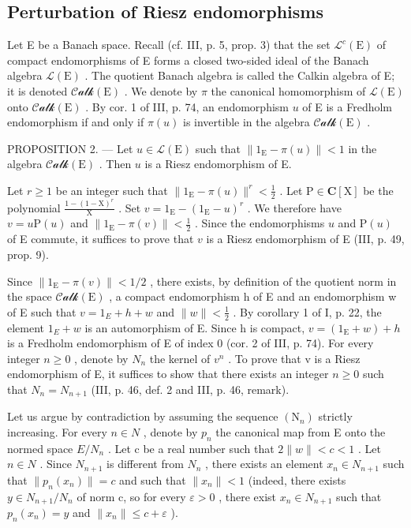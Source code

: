 \subsection{Perturbation of Riesz endomorphisms}

Let E be a Banach space. Recall (cf. III, p. 5, prop. 3) that the set \(\mathcal{L}^c (\mathrm{E})\) of compact endomorphisms of E forms a closed two-sided ideal of the Banach algebra \(\mathcal{L}(\mathrm{E})\) . The quotient Banach algebra is called the Calkin algebra of E; it is denoted \(\mathcal{Calk}(\mathrm{E})\) . We denote by \(\pi\) the canonical homomorphism of \(\mathcal{L}(\mathrm{E})\) onto \(\mathcal{Calk}(\mathrm{E})\) . By cor. 1 of III, p. 74, an endomorphism \(u\) of E is a Fredholm endomorphism if and only if \(\pi (u)\) is invertible in the algebra \(\mathcal{Calk}(\mathrm{E})\) .

PROPOSITION 2. --- Let \(u \in \mathcal{L}(\mathrm{E})\) such that \(\|1_{\mathrm{E}} - \pi(u)\| < 1\) in the algebra \(\mathcal{Calk}(\mathrm{E})\) . Then \(u\) is a Riesz endomorphism of E.

Let \(r \geqslant 1\) be an integer such that \(\| 1_{\mathrm{E}} - \pi(u)\|^{r} < \frac{1}{2}\) . Let \(\mathrm{P} \in \mathbf{C}[\mathrm{X}]\) be the polynomial \(\frac{1 - (1 - \mathrm{X})^r}{\mathrm{X}}\) . Set \(v = 1_{\mathrm{E}} - (1_{\mathrm{E}} - u)^r\) . We therefore have \(v = u\mathrm{P}(u)\) and \(\| 1_{\mathrm{E}} - \pi(v)\| < \frac{1}{2}\) . Since the endomorphisms \(u\) and \(\mathrm{P}(u)\) of E commute, it suffices to prove that \(v\) is a Riesz endomorphism of E (III, p. 49, prop. 9).

Since \(\|1_{\mathrm{E}}-\pi(v)\|<1/2\) , there exists, by definition of the quotient norm in the space \(\mathcal{Calk}(\mathrm{E})\) , a compact endomorphism h of E and an endomorphism w of E such that \(v=1_{E}+h+w\) and \(\|w\|<\frac{1}{2}\) . By corollary 1 of I, p. 22, the element \(1_{E}+w\) is an automorphism of E. Since h is compact, \(v=(1_{\mathrm{E}}+w)+h\) is a Fredholm endomorphism of E of index 0 (cor. 2 of III, p. 74). For every integer \(n\geqslant0\) , denote by \(N_{n}\) the kernel of \(v^{n}\) . To prove that v is a Riesz endomorphism of E, it suffices to show that there exists an integer \(n \geqslant 0\) such that \(N_{n} = N_{n+1}\) (III, p. 46, def. 2 and III, p. 46, remark).

Let us argue by contradiction by assuming the sequence \((\mathrm{N}_{n})\) strictly increasing. For every \(n \in N\) , denote by \(p_{n}\) the canonical map from E onto the normed space \(E/N_{n}\) . Let c be a real number such that \(2\|w\| < c < 1\) . Let \(n \in N\) . Since \(N_{n+1}\) is different from \(N_{n}\) , there exists an element \(x_{n} \in N_{n+1}\) such that \(\|p_{n}(x_{n})\| = c\) and such that \(\|x_{n}\| < 1\) (indeed, there exists \(y \in N_{n+1}/N_{n}\) of norm c, so for every \(\varepsilon > 0\) , there exist \(x_{n} \in N_{n+1}\) such that \(p_{n}(x_{n}) = y\) and \(\|x_{n}\| \leqslant c + \varepsilon\) ).

